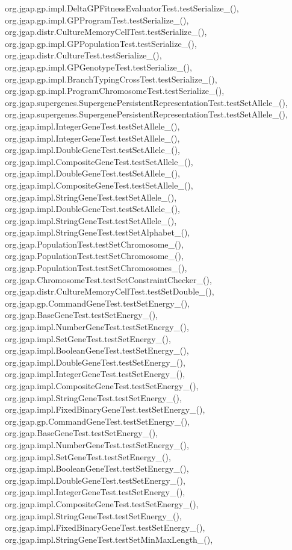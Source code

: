 org.\-jgap.\-gp.\-impl.\-Delta\-G\-P\-Fitness\-Evaluator\-Test.\-test\-Serialize\-\_(), org.\-jgap.\-gp.\-impl.\-G\-P\-Program\-Test.\-test\-Serialize\-\_(), org.\-jgap.\-distr.\-Culture\-Memory\-Cell\-Test.\-test\-Serialize\-\_(), org.\-jgap.\-gp.\-impl.\-G\-P\-Population\-Test.\-test\-Serialize\-\_(), org.\-jgap.\-distr.\-Culture\-Test.\-test\-Serialize\-\_(), org.\-jgap.\-gp.\-impl.\-G\-P\-Genotype\-Test.\-test\-Serialize\-\_(), org.\-jgap.\-gp.\-impl.\-Branch\-Typing\-Cross\-Test.\-test\-Serialize\-\_(), org.\-jgap.\-gp.\-impl.\-Program\-Chromosome\-Test.\-test\-Serialize\-\_(), org.\-jgap.\-supergenes.\-Supergene\-Persistent\-Representation\-Test.\-test\-Set\-Allele\-\_(), org.\-jgap.\-supergenes.\-Supergene\-Persistent\-Representation\-Test.\-test\-Set\-Allele\-\_(), org.\-jgap.\-impl.\-Integer\-Gene\-Test.\-test\-Set\-Allele\-\_(), org.\-jgap.\-impl.\-Integer\-Gene\-Test.\-test\-Set\-Allele\-\_(), org.\-jgap.\-impl.\-Double\-Gene\-Test.\-test\-Set\-Allele\-\_(), org.\-jgap.\-impl.\-Composite\-Gene\-Test.\-test\-Set\-Allele\-\_(), org.\-jgap.\-impl.\-Double\-Gene\-Test.\-test\-Set\-Allele\-\_(), org.\-jgap.\-impl.\-Composite\-Gene\-Test.\-test\-Set\-Allele\-\_(), org.\-jgap.\-impl.\-String\-Gene\-Test.\-test\-Set\-Allele\-\_(), org.\-jgap.\-impl.\-Double\-Gene\-Test.\-test\-Set\-Allele\-\_(), org.\-jgap.\-impl.\-String\-Gene\-Test.\-test\-Set\-Allele\-\_(), org.\-jgap.\-impl.\-String\-Gene\-Test.\-test\-Set\-Alphabet\-\_(), org.\-jgap.\-Population\-Test.\-test\-Set\-Chromosome\-\_(), org.\-jgap.\-Population\-Test.\-test\-Set\-Chromosome\-\_(), org.\-jgap.\-Population\-Test.\-test\-Set\-Chromosomes\-\_(), org.\-jgap.\-Chromosome\-Test.\-test\-Set\-Constraint\-Checker\-\_(), org.\-jgap.\-distr.\-Culture\-Memory\-Cell\-Test.\-test\-Set\-Double\-\_(), org.\-jgap.\-gp.\-Command\-Gene\-Test.\-test\-Set\-Energy\-\_(), org.\-jgap.\-Base\-Gene\-Test.\-test\-Set\-Energy\-\_(), org.\-jgap.\-impl.\-Number\-Gene\-Test.\-test\-Set\-Energy\-\_(), org.\-jgap.\-impl.\-Set\-Gene\-Test.\-test\-Set\-Energy\-\_(), org.\-jgap.\-impl.\-Boolean\-Gene\-Test.\-test\-Set\-Energy\-\_(), org.\-jgap.\-impl.\-Double\-Gene\-Test.\-test\-Set\-Energy\-\_(), org.\-jgap.\-impl.\-Integer\-Gene\-Test.\-test\-Set\-Energy\-\_(), org.\-jgap.\-impl.\-Composite\-Gene\-Test.\-test\-Set\-Energy\-\_(), org.\-jgap.\-impl.\-String\-Gene\-Test.\-test\-Set\-Energy\-\_(), org.\-jgap.\-impl.\-Fixed\-Binary\-Gene\-Test.\-test\-Set\-Energy\-\_(), org.\-jgap.\-gp.\-Command\-Gene\-Test.\-test\-Set\-Energy\-\_(), org.\-jgap.\-Base\-Gene\-Test.\-test\-Set\-Energy\-\_(), org.\-jgap.\-impl.\-Number\-Gene\-Test.\-test\-Set\-Energy\-\_(), org.\-jgap.\-impl.\-Set\-Gene\-Test.\-test\-Set\-Energy\-\_(), org.\-jgap.\-impl.\-Boolean\-Gene\-Test.\-test\-Set\-Energy\-\_(), org.\-jgap.\-impl.\-Double\-Gene\-Test.\-test\-Set\-Energy\-\_(), org.\-jgap.\-impl.\-Integer\-Gene\-Test.\-test\-Set\-Energy\-\_(), org.\-jgap.\-impl.\-Composite\-Gene\-Test.\-test\-Set\-Energy\-\_(), org.\-jgap.\-impl.\-String\-Gene\-Test.\-test\-Set\-Energy\-\_(), org.\-jgap.\-impl.\-Fixed\-Binary\-Gene\-Test.\-test\-Set\-Energy\-\_(), org.\-jgap.\-impl.\-String\-Gene\-Test.\-test\-Set\-Min\-Max\-Length\-\_(), 